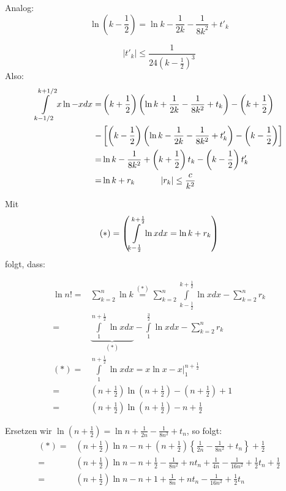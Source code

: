 \noindent Analog:
\[\ln \left( {k - \frac{1}{2}} \right) = \ln k - \frac{1}{{2k}} - \frac{1}{{8{k^2}}} + {t'_k}\]

\[\left| {{t'_k}} \right| \le \frac{1}{{24{\left(k-\frac{1}{2}\right)^3}}}\]
Also:
\begin{align*}
\int\limits_{k - 1/2}^{k + 1/2} x\ln  - xdx =& \left( {k + \frac{1}{2}} \right)\left( {\ln k + \frac{1}{{2k}} - \frac{1}{{8{k^2}}} + {t_k}} \right) - \left( {k + \frac{1}{2}} \right)\\
-&\left[ {\left( {k - \frac{1}{2}} \right)\left( {\ln k - \frac{1}{2k} - \frac{1}{8{k^2}} + t{'_k}} \right) - \left( {k - \frac{1}{2}} \right)} \right]\\
=&\ln k - \frac{1}{8{k^2}} + \left( {k + \frac{1}{2}} \right){t_k} - \left( {k - \frac{1}{2}} \right)t{'_k}\\
=&\ln k + {r_k}\hspace{10mm}\left| {r_k} \right| \le \frac{c}{k^2}
\end{align*}

\noindent Mit
\[(\text{\textasteriskcentered}) = \left( {\int\limits_{k - \frac{1}{2}}^{k + \frac{1}{2}} {\ln xdx = \ln k + {r_k}} } \right)\]
\noindent folgt, dass:

\begin{align*}
\ln n! =&\sum\limits_{k = 2}^n {\ln k\mathop {{\text{  }} = }\limits^{(*)} \sum\limits_{k = 2}^n {\int\limits_{k - \frac{1}{2}}^{k + \frac{1}{2}} {\ln xdx} }  - \sum\limits_{k = 2}^n {{r_k}} } \\
 =&\underbrace {\int\limits_1^{n + \frac{1}{2}} {\ln xdx} }_{( * )} - \int\limits_1^{\frac{3}{2}} {\ln xdx - \sum\limits_{k = 2}^n {{r_k}} } \\
( * ) =&\int\limits_1^{n + \frac{1}{2}} {\ln xdx = \left. {x\ln x - x} \right|_1^{n + \frac{1}{2}}}\\
 =&\left( {n + \frac{1}{2}} \right)\ln \left( {n + \frac{1}{2}} \right) - \left( {n + \frac{1}{2}} \right) + 1\\
 =&\left( {n + \frac{1}{2}} \right)\ln \left( {n + \frac{1}{2}} \right) - n + \frac{1}{2}
\end{align*}

Ersetzen wir $\ln \left( {n + \frac{1}{2}} \right) = \ln n + \frac{1}{{2n}} - \frac{1}{{8{n^2}}} + {t_n}$, so folgt:
\begin{align*}
(*) =&\left( {n + \frac{1}{2}} \right)\ln n - n + \left( {n + \frac{1}{2}} \right)\left\{ {\frac{1}{{2n}} - \frac{1}{{8{n^2}}} + {t_n}} \right\} + \frac{1}{2}\\
 =&\left( {n + \frac{1}{2}} \right)\ln n - n + \frac{1}{2} - \frac{1}{{8{n^2}}} + n{t_n} + \frac{1}{{4n}} - \frac{1}{{16{n^2}}} + \frac{1}{2}{t_n} + \frac{1}{2}\\
 =&\left( {n + \frac{1}{2}} \right)\ln n - n + 1 + \frac{1}{{8n}} + n{t_n} - \frac{1}{{16{n^2}}} + \frac{1}{2}{t_n}
\end{align*}

